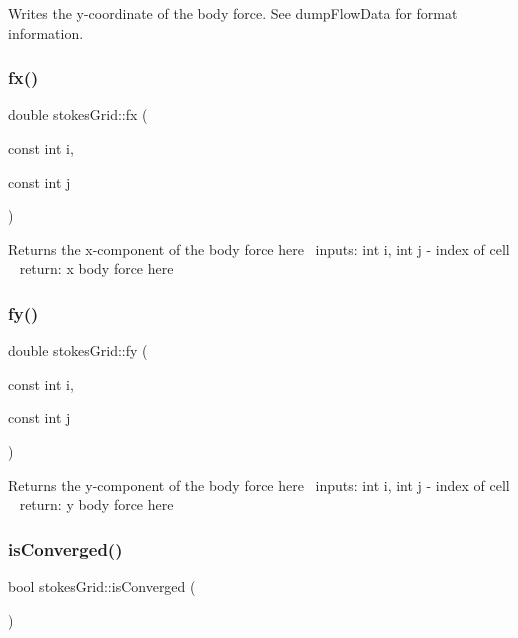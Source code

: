 Writes the y-\/coordinate of the body force. See dump\+Flow\+Data for format information. \mbox{\label{classstokesGrid_aac7540232f0fb8eb07db258ebd5e7774}} 
\subsubsection{\texorpdfstring{fx()}{fx()}}
{\footnotesize\ttfamily double stokes\+Grid\+::fx (\begin{DoxyParamCaption}\item[{const int}]{i,  }\item[{const int}]{j }\end{DoxyParamCaption})}

Returns the x-\/component of the body force here~\newline
inputs\+: int i, int j -\/ index of cell ~\newline
return\+: x body force here \mbox{\label{classstokesGrid_a9a3c0ef33e9c5a6971c8c50319f22e39}} 
\subsubsection{\texorpdfstring{fy()}{fy()}}
{\footnotesize\ttfamily double stokes\+Grid\+::fy (\begin{DoxyParamCaption}\item[{const int}]{i,  }\item[{const int}]{j }\end{DoxyParamCaption})}

Returns the y-\/component of the body force here~\newline
inputs\+: int i, int j -\/ index of cell ~\newline
return\+: y body force here \mbox{\label{classstokesGrid_a08b3fe0546ec608ad9c333be5d4526f1}} 
\subsubsection{\texorpdfstring{is\+Converged()}{isConverged()}}
{\footnotesize\ttfamily bool stokes\+Grid\+::is\+Converged (\begin{DoxyParamCaption}{ }\end{DoxyParamCaption})}

